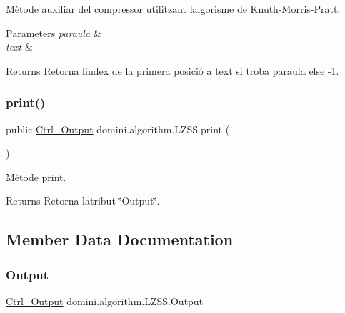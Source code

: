 Mètode auxiliar del compressor utilitzant l\textquotesingle{}algorisme de Knuth-\/\+Morris-\/\+Pratt. 


\begin{DoxyParams}{Parameters}
{\em paraula} & \\
\hline
{\em text} & \\
\hline
\end{DoxyParams}
\begin{DoxyReturn}{Returns}
Retorna l\textquotesingle{}index de la primera posició a text si troba paraula else -\/1. 
\end{DoxyReturn}
\mbox{\label{classdomini_1_1algorithm_1_1LZSS_a8172ff7c8aefb87c90c648bc1b6b78b9}} 
\subsubsection{\texorpdfstring{print()}{print()}}
{\footnotesize\ttfamily public \hyperlink{classpersistencia_1_1output_1_1Ctrl__Output}{Ctrl\+\_\+\+Output} domini.\+algorithm.\+L\+Z\+S\+S.\+print (\begin{DoxyParamCaption}{ }\end{DoxyParamCaption})\hspace{0.3cm}{\ttfamily [inline]}}



Mètode print. 

\begin{DoxyReturn}{Returns}
Retorna l\textquotesingle{}atribut \char`\"{}\+Output\char`\"{}. 
\end{DoxyReturn}


\subsection{Member Data Documentation}
\mbox{\label{classdomini_1_1algorithm_1_1LZSS_ab15cbc33a0590c2ac42127ca16821fef}} 
\subsubsection{\texorpdfstring{Output}{Output}}
{\footnotesize\ttfamily \hyperlink{classpersistencia_1_1output_1_1Ctrl__Output}{Ctrl\+\_\+\+Output} domini.\+algorithm.\+L\+Z\+S\+S.\+Output\hspace{0.3cm}{\ttfamily [private]}}


